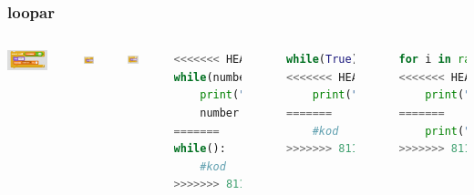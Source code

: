 \documentclass{beamer}
\begin{document}
\begin{frame}[fragile]
	\frametitle{loopar}

	\begin{columns}[c] %
    	\begin{center}
     		\includegraphics[width=0.7\textwidth]{blocks/while_loop.png}
     	\end{center}
     	\begin{center}
     	     \includegraphics[width=0.4\textwidth]{blocks/While_true.png}
     	\end{center}
     	\begin{center}
     	     \includegraphics[width=0.4\textwidth]{blocks/for_loop.png}
     	\end{center}

		\begin{lstlisting}[language=Python]
<<<<<<< HEAD
while(number < 10):
	print("Hello!")
	number += 1
=======
while():
	#kod
>>>>>>> 81150f4df45069884fc1aed3377a7335635f6572
		\end{lstlisting}
		\
		
		\begin{lstlisting}[language=Python]
while(True):
<<<<<<< HEAD
   	print("Hello!")
=======
	#kod
>>>>>>> 81150f4df45069884fc1aed3377a7335635f6572
		\end{lstlisting}
		\
		
		\begin{lstlisting}[language=Python]
for i in range(10):
<<<<<<< HEAD
    print("Hello!")
=======
	print("Hello!")
>>>>>>> 81150f4df45069884fc1aed3377a7335635f6572
		\end{lstlisting}
    \end{columns}
\end{frame}
\end{document}
